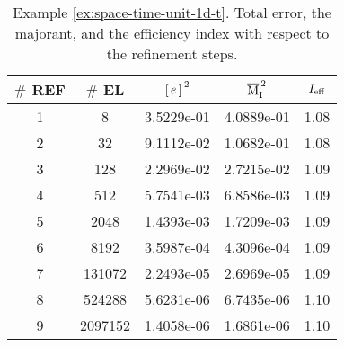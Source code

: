 \begin{example}
\begin{table}[!ht]
\centering
\footnotesize
\begin{tabular}{c|c|ccc}
$\#$ REF & $\#$ EL & ${[\,e\,]\,}^2$ & $\overline{\mathrm M}^{\,2}_{\mathrm{I}}$ & $I_{\rm eff}$\\
\midrule
1 & 8 & 3.5229e-01 & 4.0889e-01 & 1.08 \\
2 & 32 & 9.1112e-02 & 1.0682e-01 & 1.08 \\ 
3 & 128 & 2.2969e-02 & 2.7215e-02 & 1.09 \\ 
4 & 512 & 5.7541e-03 & 6.8586e-03 & 1.09 \\ 
5 & 2048 & 1.4393e-03 & 1.7209e-03 & 1.09 \\ 
6 & 8192 & 3.5987e-04 & 4.3096e-04 & 1.09 \\
7 & 131072 & 2.2493e-05 & 2.6969e-05 & 1.09 \\
8 & 524288 & 5.6231e-06 & 6.7435e-06 & 1.10 \\
9 & 2097152 & 1.4058e-06 & 1.6861e-06 & 1.10 \\
\end{tabular}
\caption{Example \ref{ex:space-time-unit-1d-t}. 
Total error, the majorant, and the efficiency index with respect to the refinement 
steps.}
\label{tab:example-space-time-unit-1d-t-e-maj-ieff}
\end{table}

\end{example}

